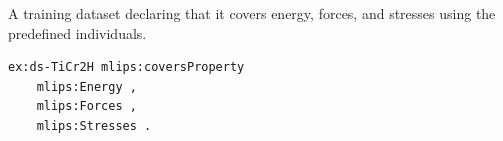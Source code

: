 A training dataset declaring that it covers energy, forces, and stresses using the predefined individuals.
\begin{lstlisting}[language=turtle]
ex:ds-TiCr2H mlips:coversProperty
    mlips:Energy ,
    mlips:Forces ,
    mlips:Stresses .
\end{lstlisting}
